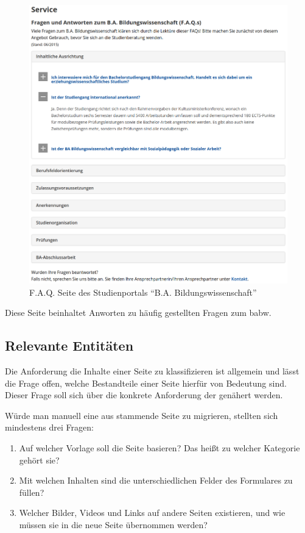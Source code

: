    \begin{figure}
        \centering
        \includegraphics[width=\textwidth]{../resources/babw_service_faq.png}
        \caption{F.A.Q. Seite des Studienportals "`B.A. Bildungswissenschaft"'}
        \label{image:BaBwFAQ}
    \end{figure}

    Diese Seite beinhaltet Anworten zu häufig gestellten Fragen
    zum \gls{babw}.

    \subsection{Relevante Entitäten}
        \label{section:classificationEntities}
        Die Anforderung die Inhalte einer Seite zu klassifizieren
        ist allgemein und lässt die Frage offen,
        welche Bestandteile einer Seite hierfür von Bedeutung sind.
        Dieser Frage soll sich über die konkrete Anforderung
        der {\fernUni} genähert werden.

        Würde man manuell eine aus {\wordpress} stammende Seite zu
        {\imperia} migrieren, stellten sich mindestens drei Fragen:

        \begin{enumerate}
            \item   Auf welcher Vorlage soll die Seite basieren?
                    Das heißt zu welcher Kategorie gehört sie?
            \item   Mit welchen Inhalten sind die unterschiedlichen Felder
                    des Formulares zu füllen?
            \item   Welcher Bilder, Videos und Links auf andere Seiten existieren,
                    und wie müssen sie in die neue Seite übernommen werden?
        \end{enumerate}

